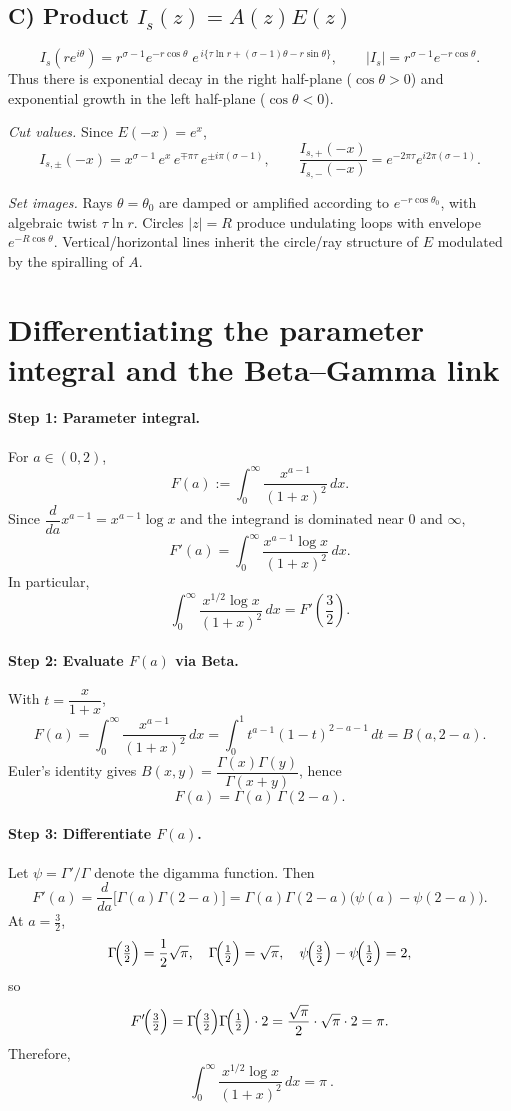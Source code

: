 \documentclass[12pt,a4paper]{article}
\begin{document}
\subsection*{C) Product \(I_s(z)=A(z)E(z)\)}
\[
I_s(re^{i\theta})=r^{\sigma-1}e^{-r\cos\theta}\;
e^{\,i\{\tau\ln r+(\sigma-1)\theta-r\sin\theta\}},
\qquad
|I_s|=r^{\sigma-1}e^{-r\cos\theta}.
\]
Thus there is exponential decay in the right half-plane (\(\cos\theta>0\)) and exponential growth in the left half-plane (\(\cos\theta<0\)).

\emph{Cut values.} Since \(E(-x)=e^{x}\),
\[
I_{s,\pm}(-x)=x^{\sigma-1}\,e^{x}\,e^{\mp\pi\tau}\,e^{\pm i\pi(\sigma-1)},\qquad
\frac{I_{s,+}(-x)}{I_{s,-}(-x)}=e^{-2\pi\tau}e^{i2\pi(\sigma-1)}.
\]

\emph{Set images.} 
Rays \(\theta=\theta_0\) are damped or amplified according to \(e^{-r\cos\theta_0}\), with algebraic twist \(\tau\ln r\).
Circles \(|z|=R\) produce undulating loops with envelope \(e^{-R\cos\theta}\).
Vertical/horizontal lines inherit the circle/ray structure of \(E\) modulated by the spiralling of \(A\).

\section*{Differentiating the parameter integral and the Beta--Gamma link}

\paragraph{Step 1: Parameter integral.}
For \(a\in(0,2)\),
\[
F(a):=\int_{0}^{\infty}\frac{x^{a-1}}{(1+x)^2}\,dx.
\]
Since \(\dfrac{d}{da}x^{a-1}=x^{a-1}\log x\) and the integrand is dominated near \(0\) and \(\infty\),
\[
F'(a)=\int_{0}^{\infty}\frac{x^{a-1}\log x}{(1+x)^2}\,dx.
\]
In particular,
\[
\int_{0}^{\infty}\frac{x^{1/2}\log x}{(1+x)^2}\,dx
=F'\!\left(\frac{3}{2}\right).
\]

\paragraph{Step 2: Evaluate \(F(a)\) via Beta.}
With \(t=\dfrac{x}{1+x}\),
\[
F(a)=\int_{0}^{\infty}\frac{x^{a-1}}{(1+x)^2}\,dx
=\int_{0}^{1} t^{a-1}(1-t)^{2-a-1}\,dt
=B(a,2-a).
\]
Euler’s identity gives \(B(x,y)=\dfrac{\Gamma(x)\Gamma(y)}{\Gamma(x+y)}\), hence
\[
F(a)=\Gamma(a)\,\Gamma(2-a).
\]

\paragraph{Step 3: Differentiate \(F(a)\).}
Let \(\psi=\Gamma'/\Gamma\) denote the digamma function. Then
\[
F'(a)=\frac{d}{da}\bigl[\Gamma(a)\Gamma(2-a)\bigr]
=\Gamma(a)\Gamma(2-a)\bigl(\psi(a)-\psi(2-a)\bigr).
\]
At \(a=\tfrac32\),
\[
\Gamma\!\Bigl(\tfrac32\Bigr)=\frac12\sqrt{\pi},\quad
\Gamma\!\Bigl(\tfrac12\Bigr)=\sqrt{\pi},\quad
\psi\!\Bigl(\tfrac32\Bigr)-\psi\!\Bigl(\tfrac12\Bigr)=2,
\]
so
\[
F'\!\Bigl(\tfrac32\Bigr)
=\Gamma\!\Bigl(\tfrac32\Bigr)\Gamma\!\Bigl(\tfrac12\Bigr)\cdot 2
=\frac{\sqrt{\pi}}{2}\cdot \sqrt{\pi}\cdot 2
=\pi.
\]
Therefore,
\[
\boxed{\ \int_{0}^{\infty}\frac{x^{1/2}\log x}{(1+x)^2}\,dx=\pi\ }.
\]
\end{document}
